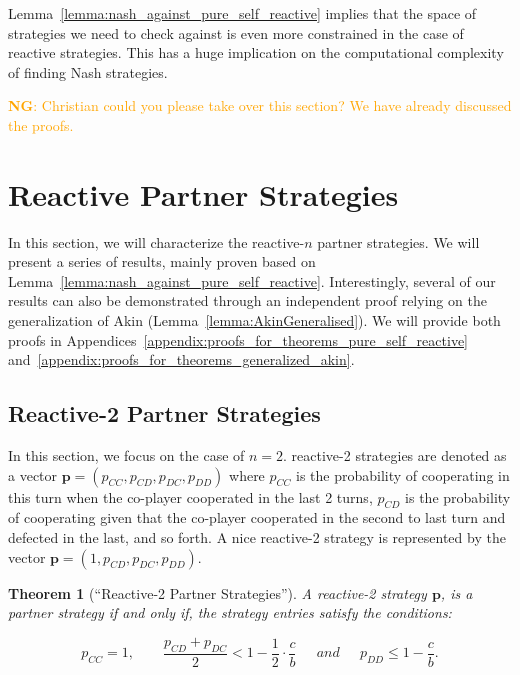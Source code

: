 \documentclass[11pt]{article}
\newcommand{\nikoleta}[1]{\textcolor{orange}{\textbf{NG}: #1}}
\theoremstyle{plainCl1}
\newtheorem{theorem}{Theorem}[section]
\theoremstyle{plainCl2}
\begin{document}
Lemma~\ref{lemma:nash_against_pure_self_reactive} implies that the space of
strategies we need to check against is even more constrained in the case of
reactive strategies. This has a huge implication on the computational complexity
of finding Nash strategies.

\nikoleta{Christian could you please take over this section? We have already
discussed the proofs.}


\section{Reactive Partner Strategies}\label{section:reactive_strategies}

In this section, we will characterize the reactive-$n$ partner strategies. We
will present a series of results, mainly proven based on
Lemma~\ref{lemma:nash_against_pure_self_reactive}. Interestingly, several of our
results can also be demonstrated through an independent proof relying on the
generalization of Akin (Lemma~\ref{lemma:AkinGeneralised}). We will provide both
proofs in Appendices~\ref{appendix:proofs_for_theorems_pure_self_reactive}
and~\ref{appendix:proofs_for_theorems_generalized_akin}.


\subsection{Reactive-2 Partner Strategies}\label{section:reactive_two_partner_strategies}

In this section, we focus on the case of $n=2$. reactive-2 strategies are denoted as a vector
$\mathbf{p}=(p_{CC}, p_{CD}, p_{DC}, p_{DD})$ where $p_{CC}$ is the
probability of cooperating in this turn when the co-player cooperated in the
last 2 turns, $p_{CD}$ is the probability of cooperating given that the
co-player cooperated in the second to last turn and defected in the last, and so
forth. A nice reactive-2 strategy is represented by the vector $\mathbf{p}=(1,
p_{CD}, p_{DC}, p_{DD})$.

\begin{theorem}[``Reactive-2 Partner Strategies'']\label{theorem:reactive_two_partner_strategies}
A reactive-2 strategy $\mathbf{p}$, is a partner strategy if and only if,
the strategy entries satisfy the conditions:

\begin{equation}\label{eq:two_bit_conditions}
  p_{CC} = 1, \qquad \displaystyle \frac{p_{CD} + p_{DC}}{2} < 1 - \frac{1}{2} \cdot \frac{c}{b} \quad ~~and~~ \quad \displaystyle p_{DD} \leq 1\!-\! \frac{c}{b}.
\end{equation}
\end{theorem}
\end{document}
